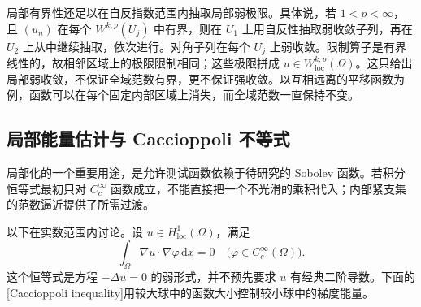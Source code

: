 \ProseParagraphBreak

局部有界性还足以在自反指数范围内抽取局部弱极限。具体说，若 \(1<p<\infty\)，且 \((u_n)\) 在每个 \(W^{k,p}(U_j)\) 中有界，则在 \(U_1\) 上用自反性抽取弱收敛子列，再在 \(U_2\) 上从中继续抽取，依次进行。对角子列在每个 \(U_j\) 上弱收敛。限制算子是有界线性的，故相邻区域上的极限限制相同；这些极限拼成 \(u\in W^{k,p}_{\mathrm{loc}}(\Omega)\)。这只给出局部弱收敛，不保证全域范数有界，更不保证强收敛。以互相远离的平移函数为例，函数可以在每个固定内部区域上消失，而全域范数一直保持不变。

\subsection{局部能量估计与 Caccioppoli 不等式}
\label{b1:subsec:220404}

局部化的一个重要用途，是允许测试函数依赖于待研究的 Sobolev 函数。若积分恒等式最初只对 \(C_c^\infty\) 函数成立，不能直接把一个不光滑的乘积代入；内部紧支集的范数逼近提供了所需过渡。

\ProseParagraphBreak

以下在实数范围内讨论。设 \(u\in H^1_{\mathrm{loc}}(\Omega)\)，满足
\begin{equation}\label{b1:eq:weak-harmonic-condition}
 \int_\Omega\nabla u\cdot\nabla\varphi\,\mathrm dx=0
 \quad\bigl(\varphi\in C_c^\infty(\Omega)\bigr).
\end{equation}
这个恒等式是方程 \(-\Delta u=0\) 的弱形式，并不预先要求 \(u\) 有经典二阶导数。下面的[Caccioppoli inequality]用较大球中的函数大小控制较小球中的梯度能量。


